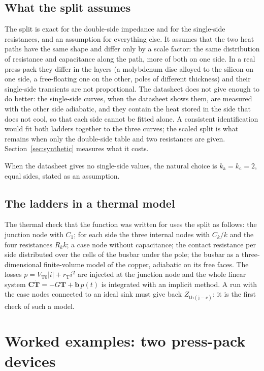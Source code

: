 \documentclass[10pt,a4paper]{scrartcl}
\newcommand{\Zjc}{Z_\mathrm{th(j-c)}}
\begin{document}
\subsection{What the split assumes}
The split is exact for the double-side impedance and for the single-side resistances, and an assumption for everything else. It assumes that the two heat paths have the same shape and differ only by a scale factor: the same distribution of resistance and capacitance along the path, more of both on one side. In a real press-pack they differ in the layers (a molybdenum disc alloyed to the silicon on one side, a free-floating one on the other, poles of different thickness) and their single-side transients are not proportional. The datasheet does not give enough to do better: the single-side curves, when the datasheet shows them, are measured with the other side adiabatic, and they contain the heat stored in the side that does not cool, so that each side cannot be fitted alone. A consistent identification would fit both ladders together to the three curves; the scaled split is what remains when only the double-side table and two resistances are given. Section~\ref{sec:synthetic} measures what it costs.

When the datasheet gives no single-side values, the natural choice is $k_\mathrm{a} = k_\mathrm{c} = 2$, equal sides, stated as an assumption.

\subsection{The ladders in a thermal model}
The thermal check that the function was written for uses the split as follows: the junction node with $C_1$; for each side the three internal nodes with $C_k/k$ and the four resistances $R_kk$; a case node without capacitance; the contact resistance per side distributed over the cells of the busbar under the pole; the busbar as a three-dimensional finite-volume model of the copper, adiabatic on its free faces. The losses $p = V_\mathrm{T0}|i| + r_\mathrm{T}i^2$ are injected at the junction node and the whole linear system $\mathbf{C}\dot{\mathbf{T}} = -G\mathbf{T} + \mathbf{b}\,p(t)$ is integrated with an implicit method. A run with the case nodes connected to an ideal sink must give back $\Zjc$: it is the first check of such a model.

\section{Worked examples: two press-pack devices}
\label{sec:examples}
\end{document}
